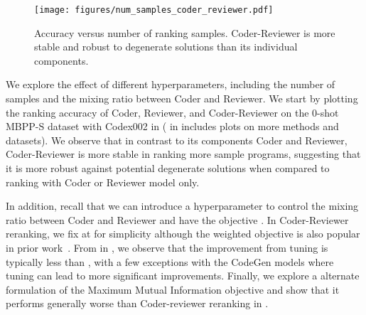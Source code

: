 \documentclass[nohyperref]{article}
\theoremstyle{plain}
\theoremstyle{definition}
\theoremstyle{remark}
\begin{document}
\begin{figure}[t]
     \centering
     \texttt{[image: figures/num\_samples\_coder\_reviewer.pdf]}
     \caption{Accuracy versus number of ranking samples. Coder-Reviewer is more stable and robust to degenerate solutions than its individual components.}
     \vspace{-5pt}
     \label{fig:num_examples_final}
     \vspace{-10pt}
\end{figure}

\label{sec:hyperparameters}
We explore the effect of different hyperparameters, including the number of samples and the mixing ratio  between Coder and Reviewer.
We start by plotting the ranking accuracy of Coder, Reviewer, and Coder-Reviewer on the 0-shot MBPP-S dataset with Codex002 in  ( in  includes plots on more methods and datasets).
We observe that in contrast to its components Coder and Reviewer, Coder-Reviewer is more stable in ranking more sample programs, suggesting that it is more robust against potential degenerate solutions when compared to ranking with Coder or Reviewer model only. 


In addition, recall that we can introduce a hyperparameter  to control the mixing ratio  between Coder and Reviewer and have the objective .
In Coder-Reviewer reranking,  we fix  at  for simplicity although the weighted objective is also popular in prior work~\citep{mmi-diversity}.
From  in , we observe that the improvement from tuning  is typically less than , with a few exceptions with the CodeGen models where tuning can lead to more significant improvements.
Finally, we explore a alternate formulation of the Maximum Mutual Information objective and show that it performs generally worse than Coder-reviewer reranking in .
\end{document}
